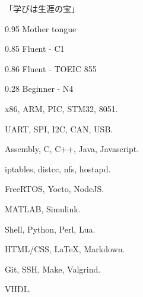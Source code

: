 \documentclass{faresume}
\begin{document}
\begin{column}[\rightcolumnwidth]


		\addcontent
		{
			{\Large\begin{CJK}{UTF8}{min}「学びは生涯の宝」\end{CJK}}
		}{}{}{}{}


		{}{}{}{}

		{}{}{}{}

		{}{}{}{}

		{}{}{}{}

		{}{}{}{}


			{0.95}
			{Mother tongue}
			{}{}{}

			{0.85}
			{Fluent - C1}
			{}{}{}

			{0.86}
			{Fluent - TOEIC 855}
			{}{}{}

			{0.28}
			{Beginner - N4}
			{}{}{}


			{x86, ARM, PIC, STM32, 8051.}
			{}{}{}{}

			{UART, SPI, I2C, CAN, USB.}
			{}{}{}{}

			{Assembly, C, C++, Java, Javascript.}
			{}{}{}{}

            {iptables, distcc, nfs, hostapd.}
            {}{}{}{}

			{FreeRTOS, Yocto, NodeJS.}
			{}{}{}{}

			{MATLAB, Simulink.}
			{}{}{}{}

			{Shell, Python, Perl, Lua.}
			{}{}{}{}

			{HTML/CSS, {\LaTeX}, Markdown.}
			{}{}{}{}

			{Git, SSH, Make, Valgrind.}
			{}{}{}{}

			{VHDL.}
			{}{}{}{}


\end{column}
\end{document}
